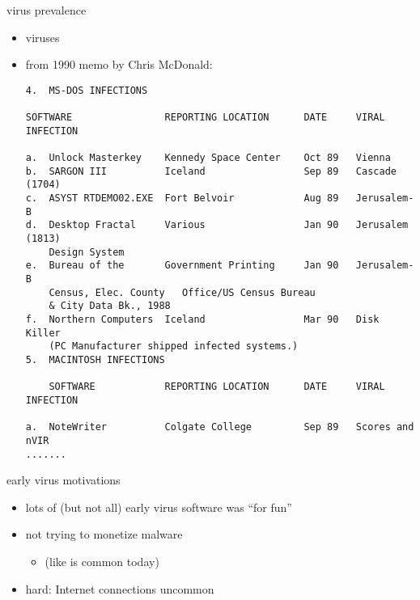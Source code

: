 
\begin{frame}[fragile,label=commercial]{virus prevalence}
    \begin{itemize}
        \item viruses 
        \item from 1990 memo by Chris McDonald:
\begin{Verbatim}[fontsize=\fontsize{8}{9}\selectfont]
4.  MS-DOS INFECTIONS

SOFTWARE                REPORTING LOCATION      DATE     VIRAL INFECTION

a.  Unlock Masterkey    Kennedy Space Center    Oct 89   Vienna
b.  SARGON III          Iceland                 Sep 89   Cascade (1704)
c.  ASYST RTDEMO02.EXE  Fort Belvoir            Aug 89   Jerusalem-B
d.  Desktop Fractal     Various                 Jan 90   Jerusalem (1813)
	Design System
e.  Bureau of the       Government Printing     Jan 90   Jerusalem-B
    Census, Elec. County   Office/US Census Bureau
    & City Data Bk., 1988
f.  Northern Computers  Iceland                 Mar 90   Disk Killer
    (PC Manufacturer shipped infected systems.)
5.  MACINTOSH INFECTIONS

    SOFTWARE            REPORTING LOCATION      DATE     VIRAL INFECTION

a.  NoteWriter          Colgate College         Sep 89   Scores and nVIR
.......
\end{Verbatim}
    \end{itemize}
\end{frame}


\begin{frame}{early virus motivations}
    \begin{itemize}
        \item lots of (but not all) early virus software was ``for fun''
        \item not trying to monetize malware
            \begin{itemize}
            \item (like is common today)
            \end{itemize}
        \item hard: Internet connections uncommon
    \end{itemize}
\end{frame}



